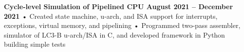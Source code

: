 \documentclass[../main.tex]{subfiles}
\begin{document}
%
\noindent\textbf{{\fontsize{\textFontSize}{\textFontBox}\selectfont Cycle-level Simulation of Pipelined CPU \hfill August 2021 – December 2021}}
\vspace{-0.0mm}\newline
%
%
{\fontsize{\textFontSize}{\textFontBox}\selectfont • \hspace{1mm} Created state machine, u-arch, and ISA support for interrupts, exceptions, virtual memory, and pipelining }\newline
{\fontsize{\textFontSize}{\textFontBox}\selectfont • \hspace{1mm} Programmed two-pass assembler, simulator of LC3-B u-arch/ISA in C, and developed framework in Python building simple tests }\newline
%
%
\end{document}
